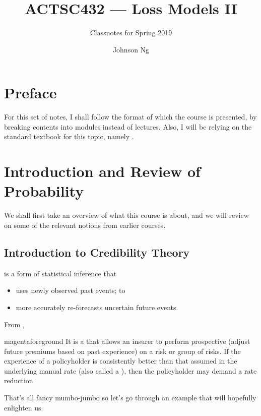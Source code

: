 \documentclass[notoc,notitlepage]{tufte-book}
\title{ACTSC432 --- Loss Models II}
\author{Johnson Ng}
\subtitle{Classnotes for Spring 2019}
\begin{document}


\chapter*{Preface}%
\label{chp:preface}

For this set of notes, I shall follow the format of which the course is
presented, by breaking contents into modules instead of lectures. Also, I will
be relying on the standard textbook for this topic, namely
\citealt{klugman2012}.


\chapter{Introduction and Review of Probability}%
\label{chp:introduction_and_review_of_probability}

We shall first take an overview of what this course is about, and we will review
on some of the relevant notions from earlier courses.

\section{Introduction to Credibility Theory}%
\label{sec:introduction_to_credibility_theory}

 is a form of statistical inference that
\begin{itemize}
  \item uses newly observed past events; to
  \item more accurately re-forecasts uncertain future events.
\end{itemize}
From \citealt{klugman2012},
\begin{quotebox}{magenta}{foreground}
  It is a  that allows an insurer to perform
  prospective  (adjust future premiums based
  on past experience) on a risk or group of risks. If the experience of a
  policyholder is consistently better than that assumed in the underlying manual
  rate (also called a ), then the policyholder may demand
  a rate reduction.
\end{quotebox}

That's all fancy mumbo-jumbo so let's go through an example that will hopefully
enlighten us.
\end{document}
